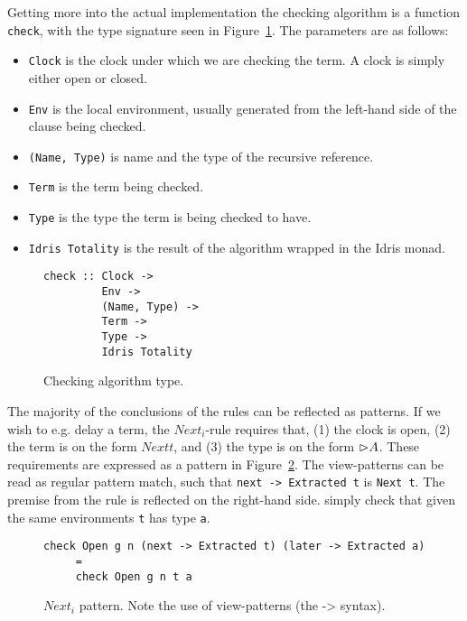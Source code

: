 Getting more into the actual implementation the checking algorithm is a function
\texttt{check}, with the type signature seen in Figure~\ref{fig:check_type}. The
parameters are as follows:

\begin{itemize}
\item \texttt{Clock} is the clock under which we are checking the term. A clock
  is simply either open or closed.
\item \texttt{Env} is the local environment, usually generated from the
  left-hand side of the clause being checked.
\item \texttt{(Name, Type)} is name and the type of the recursive
  reference. 
\item \texttt{Term} is the term being checked.
\item \texttt{Type} is the type the term is being checked to have.
\item \texttt{Idris Totality} is the result of the algorithm wrapped in the
  Idris monad. 
\end{itemize}

\begin{figure}[h]
\begin{lstlisting}
check :: Clock -> 
         Env -> 
         (Name, Type) -> 
         Term -> 
         Type -> 
         Idris Totality
\end{lstlisting}  
  \caption{Checking algorithm type.}
  \label{fig:check_type}
\end{figure}

The majority of the conclusions of the rules can be reflected as patterns. If we
wish to e.g. delay a term, the $Next_i$-rule requires that, (1) the clock is
open, (2) the term is on the form $Next t$, and (3) the type is on the form
$\rhd A$. These requirements are expressed as a pattern in
Figure~\ref{fig:next_pattern}. The view-patterns can be read as regular pattern
match, such that \texttt{next -> Extracted t} is \texttt{Next t}. The premise
from the rule is reflected on the right-hand side. simply check that given the
same environments \texttt{t} has type \texttt{a}.

\begin{figure}[h]
\begin{lstlisting}
check Open g n (next -> Extracted t) (later -> Extracted a) 
     =
     check Open g n t a
\end{lstlisting}
  \caption{$Next_{i}$ pattern. Note the use of view-patterns (the -> syntax).}
  \label{fig:next_pattern}
\end{figure}

